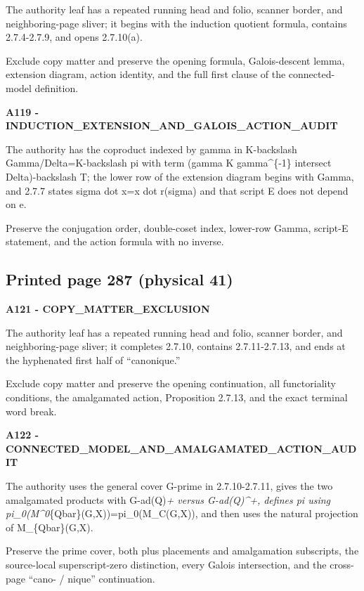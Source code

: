 \documentclass[10pt,a4paper]{article}
\begin{document}
The authority leaf has a repeated running head and folio, scanner border, and neighboring-page sliver; it begins with the induction quotient formula, contains 2.7.4-2.7.9, and opens 2.7.10(a).

Exclude copy matter and preserve the opening formula, Galois-descent lemma, extension diagram, action identity, and the full first clause of the connected-model definition.

\textbf{A119 - INDUCTION\_EXTENSION\_AND\_GALOIS\_ACTION\_AUDIT}

The authority has the coproduct indexed by gamma in K-backslash Gamma/Delta=K-backslash pi with term (gamma K gamma\^{}\{-1\} intersect Delta)-backslash T; the lower row of the extension diagram begins with Gamma, and 2.7.7 states sigma dot x=x dot r(sigma) and that script E does not depend on e.

Preserve the conjugation order, double-coset index, lower-row Gamma, script-E statement, and the action formula with no inverse.

\subsection{Printed page 287 (physical 41)}

\textbf{A121 - COPY\_MATTER\_EXCLUSION}

The authority leaf has a repeated running head and folio, scanner border, and neighboring-page sliver; it completes 2.7.10, contains 2.7.11-2.7.13, and ends at the hyphenated first half of ``canonique.''

Exclude copy matter and preserve the opening continuation, all functoriality conditions, the amalgamated action, Proposition 2.7.13, and the exact terminal word break.

\textbf{A122 - CONNECTED\_MODEL\_AND\_AMALGAMATED\_ACTION\_AUDIT}

The authority uses the general cover G-prime in 2.7.10-2.7.11, gives the two amalgamated products with G-ad(Q)\emph{+ versus G-ad(Q)\^{}+, defines pi using pi\_0(M\^{}0}\{Qbar\}(G,X))=pi\_0(M\_C(G,X)), and then uses the natural projection of M\_\{Qbar\}(G,X).

Preserve the prime cover, both plus placements and amalgamation subscripts, the source-local superscript-zero distinction, every Galois intersection, and the cross-page ``cano- / nique'' continuation.
\end{document}
